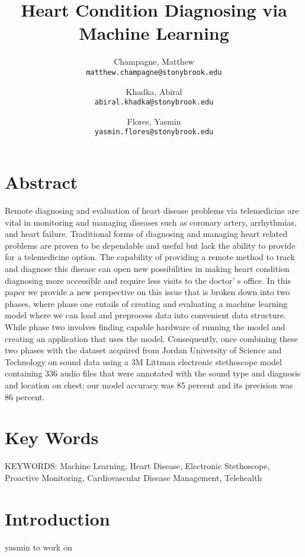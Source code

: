 \documentclass[twocolumn]{article}
\begin{document}
\title{Heart Condition Diagnosing via Machine Learning}
\author{
  Champagne, Matthew \\
  \texttt{matthew.champagne@stonybrook.edu}
  \and
  Khadka, Abiral \\
  \texttt{abiral.khadka@stonybrook.edu}
  \and
  Flores, Yasmin \\
  \texttt{yasmin.flores@stonybrook.edu}
}

\maketitle
\section{Abstract} 
Remote diagnosing and evaluation of heart disease problems via telemedicine are vital in monitoring 
and managing diseases such as coronary artery, arrhythmias, and heart failure. Traditional forms 
of diagnosing and managing heart related problems are proven to be dependable and useful 
but lack the ability to provide for a telemedicine option. The capability of providing 
a remote method to track and diagnose this disease can open new possibilities in 
making heart condition diagnosing more accessible and require less visits to the doctor’
s office. In this paper we provide a new perspective on this issue that 
is broken down into two phases, where phase one entails of creating and evaluating 
a machine learning model where we can load and preprocess data into convenient data 
structure. While phase two involves finding capable hardware of running the model and creating 
an application that uses the model. Consequently, once combining these two phases with the 
dataset acquired from Jordan University of Science and Technology on sound data using a 
3M Littman electronic stethoscope model containing 336 audio files that were annotated with the 
sound type and diagnosis and location on chest; our model accuracy was 85 percent and its precision was 86 percent. 

\section{Key Words} 
KEYWORDS: Machine Learning, Heart Disease, Electronic Stethoscope, Proactive Monitoring, Cardiovascular Disease Management, Telehealth 

\section{Introduction}
yasmin to work on 
\end{document}
